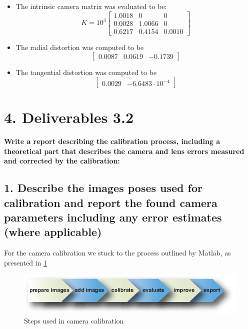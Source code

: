 \begin{itemize}
	
\item The intrinsic camera matrix was evaluated to be:
\begin{equation}
K = 10^3\begin{bmatrix}
1.0018 & 0 & 0 \\
0.0028 & 1.0066 & 0 \\
0.6217 & 0.4154 & 0.0010
\end{bmatrix}
\end{equation}
\item The radial distortion was computed to be 
\begin{equation}
\begin{bmatrix}
0.0087 & 0.0619 & -0.1739
\end{bmatrix}
\end{equation}
\item The tangential distortion was computed to be 
\begin{equation}
\begin{bmatrix}
0.0029 & -6.6483 \cdot 10^{-4}
\end{bmatrix}
\end{equation}
\end{itemize}

\section*{4. Deliverables 3.2}
\textbf{Write a report describing the calibration process, including a theoretical part that describes the camera and lens errors measured and corrected by the calibration:}
\subsection*{1. Describe the images poses used for calibration and report the found camera parameters including any error estimates (where applicable)}
For the camera calibration we stuck to the process outlined by Matlab, as presented in \ref{fig:cameracalibratorappsteps}

\begin{figure}[ht!]
	\centering
	\includegraphics[width=0.7\linewidth]{graphics/cameracalibrator_app_steps}
	\caption{Steps used in camera calibration}
	\label{fig:cameracalibratorappsteps}
\end{figure}

